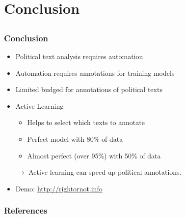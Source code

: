 \documentclass[]{beamer}
\begin{document}
\section{Conclusion}
\subsection{}


\begin{frame}\frametitle{Conclusion}
\begin{itemize}
\item Political text analysis requires automation
\item Automation requires annotations for training models
\item Limited budged for annotations of political texts 
\item Active Learning
\begin{itemize}
\item Helps to select which texts to annotate
\item Perfect model with 80\% of data
\item Almost perfect (over 95\%) with 50\% of data
\end{itemize}
\item[$\rightarrow$] Active learning can speed up political annotations. 
\item Demo: \url{http://rightornot.info}
\end{itemize}
\end{frame}

\begin{frame}\frametitle{References}


\def\newblock{}
\vspace{2em}
 
\end{frame}
\end{document}
